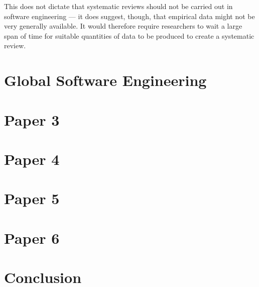 This does not dictate that systematic reviews should not be carried out in software engineering --- it does suggest, though, that empirical data might not be very generally available. It would therefore require researchers to wait a large span of time for suitable quantities of data to be produced to create a systematic review.\par


\section{Global Software Engineering}




\section{Paper 3}



\section{Paper 4}



\section{Paper 5}



\section{Paper 6}



\section{Conclusion}








